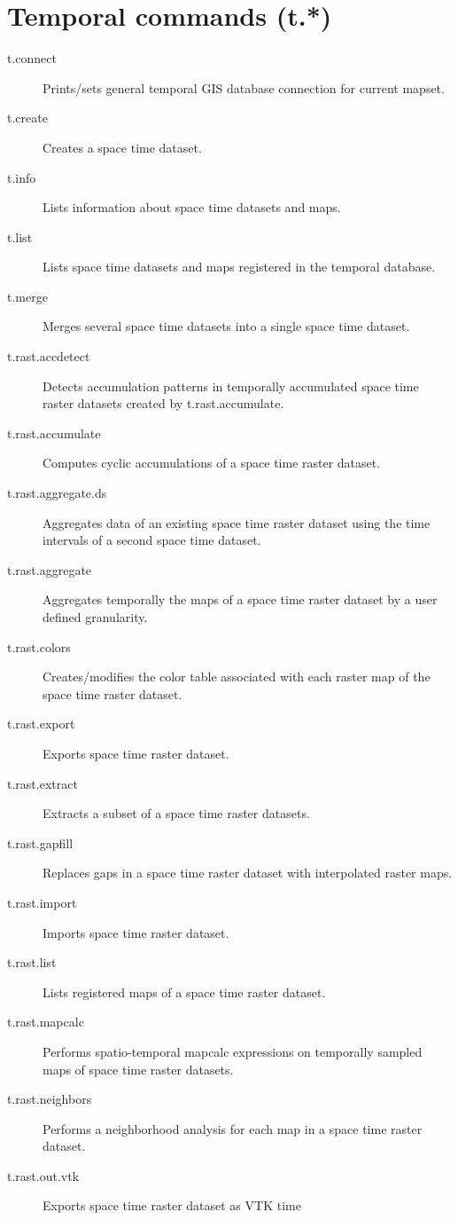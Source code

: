 
\section{Temporal commands (t.{*})}
\begin{description}
\item [{t.connect}] Prints/sets general temporal GIS database connection
for current mapset.
\item [{t.create}] Creates a space time dataset.
\item [{t.info}] Lists information about space time datasets and maps.
\item [{t.list}] Lists space time datasets and maps registered in the temporal
database.
\item [{t.merge}] Merges several space time datasets into a single space
time dataset.
\item [{t.rast.accdetect}] Detects accumulation patterns in temporally
accumulated space time raster datasets created by t.rast.accumulate.
\item [{t.rast.accumulate}] Computes cyclic accumulations of a space time
raster dataset.
\item [{t.rast.aggregate.ds}] Aggregates data of an existing space time
raster dataset using the time intervals of a second space time dataset.
\item [{t.rast.aggregate}] Aggregates temporally the maps of a space time
raster dataset by a user defined granularity.
\item [{t.rast.colors}] Creates/modifies the color table associated with
each raster map of the space time raster dataset.
\item [{t.rast.export}] Exports space time raster dataset.
\item [{t.rast.extract}] Extracts a subset of a space time raster datasets.
\item [{t.rast.gapfill}] Replaces gaps in a space time raster dataset with
interpolated raster maps.
\item [{t.rast.import}] Imports space time raster dataset.
\item [{t.rast.list}] Lists registered maps of a space time raster dataset.
\item [{t.rast.mapcalc}] Performs spatio-temporal mapcalc expressions on
temporally sampled maps of space time raster datasets.
\item [{t.rast.neighbors}] Performs a neighborhood analysis for each map
in a space time raster dataset.
\item [{t.rast.out.vtk}] Exports space time raster dataset as VTK time

\end{description}

